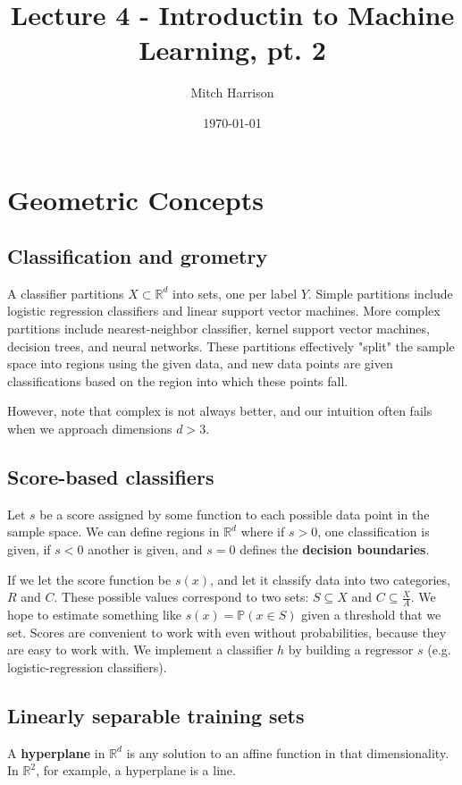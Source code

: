 \documentclass[titlepage, 12pt, leqno]{article}
\title{\Huge{Lecture 4 - Introductin to Machine Learning, pt. 2}}
\author{\large{Mitch Harrison}}
\date{\today}
\begin{document}
\setlength{\parskip}{1\baselineskip}
\setlength{\parindent}{15pt}
\maketitle
\tableofcontents
\newpage


\section{Geometric Concepts}
\subsection{Classification and grometry}
A classifier partitions $X \subset \mathbb{R}^{d}$ into sets, one per label $Y$.
Simple partitions include logistic regression classifiers and linear support 
vector machines. More complex partitions include nearest-neighbor classifier,
kernel support vector machines, decision trees, and neural networks. These
partitions effectively "split" the sample space into regions using the given 
data, and new data points are given classifications based on the region into
which these points fall.

However, note that complex is not always better, and our intuition often fails
when we approach dimensions $d>3$.

\subsection{Score-based classifiers}
Let $s$ be a score assigned by some function to each possible data point in the
sample space. We can define regions in $ \mathbb{R}^{d}$ where if $s>0$, one
classification is given, if $s<0$ another is given, and $s=0 $ defines the
\textbf{decision boundaries}.

If we let the score function be $s(x)$, and let it classify data into two 
categories, $R$ and $C$. These possible values correspond to two sets: 
$S \subseteq X$ and $C \subseteq \frac{X}{A}$. We hope to estimate something like
$s(x) = \mathbb{P}(x \in S)$ given a threshold that we set. Scores are convenient
to work with even without probabilities, because they are easy to work with. We
implement a classifier $h$ by building a regressor $s$ (e.g. logistic-regression
classifiers).

\subsection{Linearly separable training sets}
\begin{definition}
    A \textbf{hyperplane} in $ \mathbb{R}^{d}$ is any solution to an affine 
    function in that dimensionality. In $ \mathbb{R}^{2}$, for example, a
    hyperplane is a line.
\end{definition}
\end{document}
